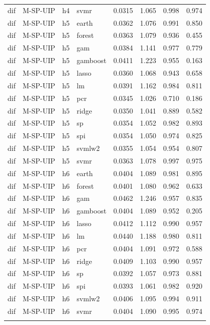 \begin{ThreePartTable}
\begin{longtable}[t]{llclcccc}
dif & M-SP-UIP & h4 & svmr & 0.0315 & 1.065 & 0.998 & 0.974\\
\addlinespace
dif & M-SP-UIP & h5 & earth & 0.0362 & 1.076 & 0.991 & 0.850\\
dif & M-SP-UIP & h5 & forest & 0.0363 & 1.079 & 0.936 & 0.455\\
dif & M-SP-UIP & h5 & gam & 0.0384 & 1.141 & 0.977 & 0.779\\
dif & M-SP-UIP & h5 & gamboost & 0.0411 & 1.223 & 0.955 & 0.163\\
dif & M-SP-UIP & h5 & lasso & 0.0360 & 1.068 & 0.943 & 0.658\\
dif & M-SP-UIP & h5 & lm & 0.0391 & 1.162 & 0.984 & 0.811\\
dif & M-SP-UIP & h5 & pcr & 0.0345 & 1.026 & 0.710 & 0.186\\
dif & M-SP-UIP & h5 & ridge & 0.0350 & 1.041 & 0.889 & 0.582\\
dif & M-SP-UIP & h5 & sp & 0.0354 & 1.052 & 0.982 & 0.893\\
dif & M-SP-UIP & h5 & spi & 0.0354 & 1.050 & 0.974 & 0.825\\
dif & M-SP-UIP & h5 & svmlw2 & 0.0355 & 1.054 & 0.954 & 0.807\\
dif & M-SP-UIP & h5 & svmr & 0.0363 & 1.078 & 0.997 & 0.975\\
\addlinespace
dif & M-SP-UIP & h6 & earth & 0.0404 & 1.089 & 0.981 & 0.895\\
dif & M-SP-UIP & h6 & forest & 0.0401 & 1.080 & 0.962 & 0.633\\
dif & M-SP-UIP & h6 & gam & 0.0462 & 1.246 & 0.957 & 0.835\\
dif & M-SP-UIP & h6 & gamboost & 0.0404 & 1.089 & 0.952 & 0.205\\
dif & M-SP-UIP & h6 & lasso & 0.0412 & 1.112 & 0.990 & 0.957\\
dif & M-SP-UIP & h6 & lm & 0.0440 & 1.188 & 0.980 & 0.811\\
dif & M-SP-UIP & h6 & pcr & 0.0404 & 1.091 & 0.972 & 0.588\\
dif & M-SP-UIP & h6 & ridge & 0.0409 & 1.103 & 0.990 & 0.957\\
dif & M-SP-UIP & h6 & sp & 0.0392 & 1.057 & 0.973 & 0.881\\
dif & M-SP-UIP & h6 & spi & 0.0393 & 1.061 & 0.982 & 0.920\\
dif & M-SP-UIP & h6 & svmlw2 & 0.0406 & 1.095 & 0.994 & 0.911\\
dif & M-SP-UIP & h6 & svmr & 0.0404 & 1.090 & 0.995 & 0.974\\
\addlinespace

\end{longtable}
\end{ThreePartTable}
